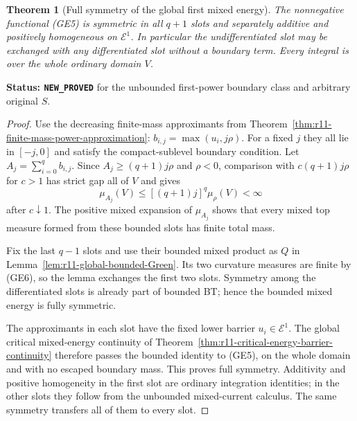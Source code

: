 \documentclass[11pt,a4paper]{article}
\numberwithin{equation}{section}
\newtheorem{theorem}{Theorem}[section]
\theoremstyle{definition}
\theoremstyle{remark}
\begin{document}
\begin{theorem}[Full symmetry of the global first mixed energy]
\label{thm:r11-global-first-mixed-symmetry}
The nonnegative functional (GE5) is symmetric in all $q+1$
slots and separately additive and positively homogeneous on
$\mathcal E^1$. In particular the undifferentiated slot may
be exchanged with any differentiated slot without a boundary
term. Every integral is over the whole ordinary domain $V$.
\end{theorem}

\noindent\textbf{Status: \texttt{NEW\_PROVED}} for the
unbounded first-power boundary class and arbitrary original $S$.

\begin{proof}
Use the decreasing finite-mass approximants from
Theorem~\ref{thm:r11-finite-mass-power-approximation}:
$b_{i,j}=\max(u_i,j\rho)$. For a fixed $j$ they all lie
in $[-j,0]$ and satisfy the compact-sublevel boundary condition.
Let $A_j=\sum_{i=0}^q b_{i,j}$. Since
$A_j\geq(q+1)j\rho$ and $\rho<0$, comparison with
$c(q+1)j\rho$ for $c>1$ has strict gap all of $V$ and gives
\[
          \mu_{A_j}(V)
              \leq[(q+1)j]^q\mu_\rho(V)<\infty
 \tag{GE6}
\]
after $c\downarrow1$. The positive mixed expansion of
$\mu_{A_j}$ shows that every mixed top measure formed from
these bounded slots has finite total mass.

Fix the last $q-1$ slots and use their bounded mixed product
as $Q$ in Lemma~\ref{lem:r11-global-bounded-Green}. Its two
curvature measures are finite by (GE6), so the lemma exchanges
the first two slots. Symmetry among the differentiated slots
is already part of bounded BT; hence the bounded mixed energy
is fully symmetric.

The approximants in each slot have the fixed lower barrier
$u_i\in\mathcal E^1$. The global critical mixed-energy
continuity of Theorem~\ref{thm:r11-critical-energy-barrier-continuity}
therefore passes the bounded identity to (GE5), on the whole
domain and with no escaped boundary mass. This proves full
symmetry. Additivity and positive homogeneity in the first
slot are ordinary integration identities; in the other slots
they follow from the unbounded mixed-current calculus. The
same symmetry transfers all of them to every slot.
\end{proof}
\end{document}
